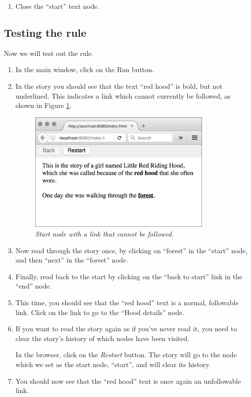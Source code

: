 \documentclass{article}
\begin{document}
\begin{enumerate}
\item Close the ``start'' text node.
\end{enumerate}

\subsection{Testing the rule}

Now we will test out the rule.

\begin{enumerate}
  \item In the main window, click on the Run button.
  \item In the story you should see that the text ``red hood'' is bold,
  but not underlined. This indicates a link which cannot currently be
  followed, as shown in Figure \ref{fig:tut1:start_with_condition}.
 
\begin{figure}[ht]
  \centering
  \includegraphics[width=9cm]{images/hypedyn-tutorial-1-figure-15}
  \caption{\textit{Start node with a link that cannot be followed.}}
  \label{fig:tut1:start_with_condition}
\end{figure} 

\item Now read through the story once, by clicking on ``forest'' in the
``start'' node, and then ``next'' in the ``forest'' node.
\item Finally, read back to the start by clicking on the ``back to start'' link in the ``end'' node.
\item This time, you should see that the ``red hood'' text is a normal,
followable link. Click on the link to go to the ``Hood details'' node.

\item If you want to read the story again as if you've never read it, you need to clear the story's history of which nodes have been visited.

In the browser, click on the \textit{Restart} button. The story will go to the node which we set as the start node, ``start'', and will clear its history.

\item You should now see that the ``red hood'' text is once again an
unfollowable link.
\end{enumerate}
\end{document}

